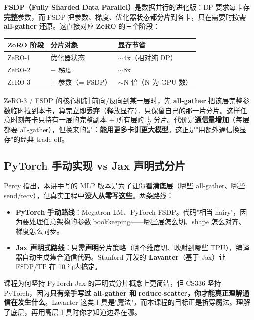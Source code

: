 \documentclass[a4paper]{article}
\begin{document}
\textbf{FSDP（Fully Sharded Data Parallel）}是数据并行的进化版：DP 要求每卡存\textbf{完整}参数，而 FSDP 把参数、梯度、优化器状态都\textbf{分片}到各卡，只在需要时按需 \textbf{all-gather} 还原。这直接对应 \textbf{ZeRO} 的三个阶段：

\begin{tabular}{p{2cm}p{4cm}p{8cm}}
\toprule
\textbf{ZeRO 阶段} & \textbf{分片对象} & \textbf{显存节省} \\
\midrule
ZeRO-1 & 优化器状态 & $\sim$4x（相对纯 DP） \\
ZeRO-2 & $+$ 梯度 & $\sim$8x \\
ZeRO-3 & $+$ 参数（= FSDP） & $\sim$N 倍（N 为 GPU 数） \\
\bottomrule
\end{tabular}

\begin{knowledgebox}{ZeRO-3 / FSDP 的核心机制}
前向/反向到某一层时，先 \textbf{all-gather} 把该层完整参数临时拉到本卡，算完立即\textbf{丢弃}（释放显存），只保留自己的那一片分片。这样任意时刻每卡只持有一层的完整副本 + 所有层的 $\frac{1}{N}$ 分片。代价是\textbf{通信量增加}（每层都要 all-gather），但换来的是：\textbf{能用更多卡训更大模型}。这正是"用额外通信换显存"的经典 trade-off。
\end{knowledgebox}

\subsection{PyTorch 手动实现 vs Jax 声明式分片}

Percy 指出，本讲手写的 MLP 版本是为了让你\textbf{看清底层}（哪些 all-gather、哪些 send/recv），但真实工程中\textbf{没人从零写这些}。两条路线：

\begin{itemize}
\item \textbf{PyTorch 手动路线}：Megatron-LM、PyTorch FSDP。代码"相当 hairy"，因为要处理任意架构的参数 bookkeeping——哪些层怎么切、shape 怎么对齐、梯度怎么同步。
\item \textbf{Jax 声明式路线}：只需\textbf{声明}分片策略（哪个维度切、映射到哪些 TPU），编译器自动生成集合通信代码。Stanford 开发的 \textbf{Lavanter}（基于 Jax）让 FSDP/TP 在 10 行内搞定。
\end{itemize}

\begin{practicebox}{课程为何坚持 PyTorch}
Jax 的声明式分片概念上更简洁，但 CS336 坚持 PyTorch，因为\textbf{只有亲手写过 all-gather 和 reduce-scatter，你才能真正理解通信在发生什么}。Lavanter 这类工具是"魔法"，而本课程的目标正是拆穿魔法。理解了底层，再用高层工具时你才知道边界在哪。
\end{practicebox}
\end{document}
